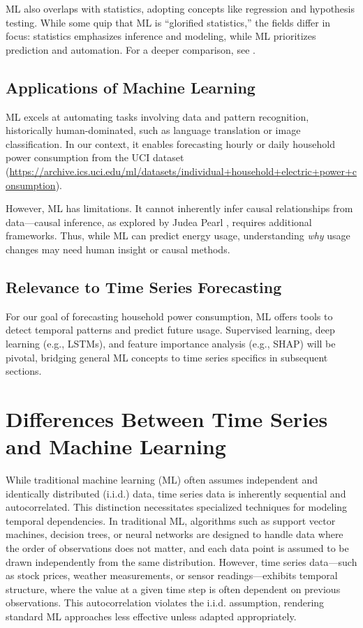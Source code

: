 	ML also overlaps with statistics, adopting concepts like regression and hypothesis testing. While some quip that ML is ``glorified statistics,'' the fields differ in focus: statistics emphasizes inference and modeling, while ML prioritizes prediction and automation. For a deeper comparison, see \cite{bzdok2018statistics}.
	
	\subsection{Applications of Machine Learning}
	ML excels at automating tasks involving data and pattern recognition, historically human-dominated, such as language translation or image classification. In our context, it enables forecasting hourly or daily household power consumption from the UCI dataset (\url{https://archive.ics.uci.edu/ml/datasets/individual+household+electric+power+consumption}).
	
	However, ML has limitations. It cannot inherently infer causal relationships from data—causal inference, as explored by Judea Pearl \cite{pearl2009causal}, requires additional frameworks. Thus, while ML can predict energy usage, understanding \textit{why} usage changes may need human insight or causal methods.
	
	\subsection{Relevance to Time Series Forecasting}
	For our goal of forecasting household power consumption, ML offers tools to detect temporal patterns and predict future usage. Supervised learning, deep learning (e.g., LSTMs), and feature importance analysis (e.g., SHAP) will be pivotal, bridging general ML concepts to time series specifics in subsequent sections.
		
	\section{Differences Between Time Series and Machine Learning}
	While traditional machine learning (ML) often assumes independent and identically distributed (i.i.d.) data, time series data is inherently sequential and autocorrelated. This distinction necessitates specialized techniques for modeling temporal dependencies. In traditional ML, algorithms such as support vector machines, decision trees, or neural networks are designed to handle data where the order of observations does not matter, and each data point is assumed to be drawn independently from the same distribution. However, time series data—such as stock prices, weather measurements, or sensor readings—exhibits temporal structure, where the value at a given time step is often dependent on previous observations. This autocorrelation violates the i.i.d. assumption, rendering standard ML approaches less effective unless adapted appropriately.
	

